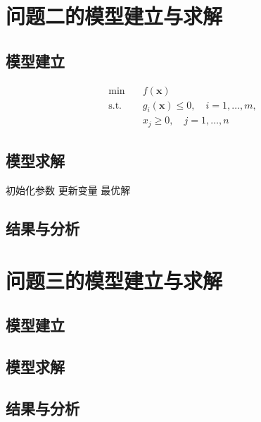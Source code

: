 \documentclass[12pt]{article}
\begin{document}
\section{问题二的模型建立与求解}
\subsection{模型建立}
\begin{align}
\min \quad & f(\mathbf{x}) \\
\text{s.t.} \quad & g_i(\mathbf{x}) \le 0, \quad i = 1, \dots, m, \nonumber \\
& x_j \ge 0, \quad j = 1, \dots, n \nonumber
\end{align}

\subsection{模型求解}
\begin{algorithm}[H]
\caption{求解算法}
\begin{algorithmic}[1]
\STATE 初始化参数
  \STATE 更新变量
\ENDWHILE
\RETURN 最优解
\end{algorithmic}
\end{algorithm}

\subsection{结果与分析}

\section{问题三的模型建立与求解}
\subsection{模型建立}
\subsection{模型求解}
\subsection{结果与分析}
\end{document}
